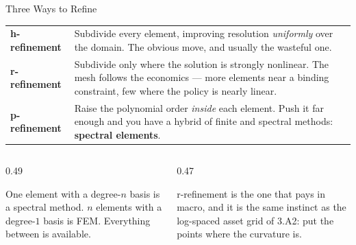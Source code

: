 \begin{frame}{Three Ways to Refine}
\small
\begin{center}
\begin{tabularx}{0.97\linewidth}{@{}>{\raggedright\arraybackslash}p{2.3cm} >{\raggedright\arraybackslash}X@{}}
\toprule
\textbf{h-refinement} & Subdivide every element, improving resolution \emph{uniformly} over the domain. The obvious move, and usually the wasteful one. \\
\textbf{r-refinement} & Subdivide only where the solution is strongly nonlinear. The mesh follows the economics --- more elements near a binding constraint, few where the policy is nearly linear. \\
\textbf{p-refinement} & Raise the polynomial order \emph{inside} each element. Push it far enough and you have a hybrid of finite and spectral methods: \textbf{spectral elements}. \\
\bottomrule
\end{tabularx}
\end{center}
\medskip
\begin{columns}[T]
\begin{column}{0.49\textwidth}
\begin{conceptbox}[title=\textbf{The design space is continuous}]\footnotesize
One element with a degree-$n$ basis is a spectral method. $n$ elements with a degree-$1$ basis is FEM. Everything between is available.
\end{conceptbox}
\end{column}
\begin{column}{0.47\textwidth}
\begin{examplebox}\footnotesize
r-refinement is the one that pays in macro, and it is the same instinct as the log-spaced asset grid of 3.A2: put the points where the curvature is.
\end{examplebox}
\end{column}
\end{columns}
\vspace{1mm}
\end{frame}


